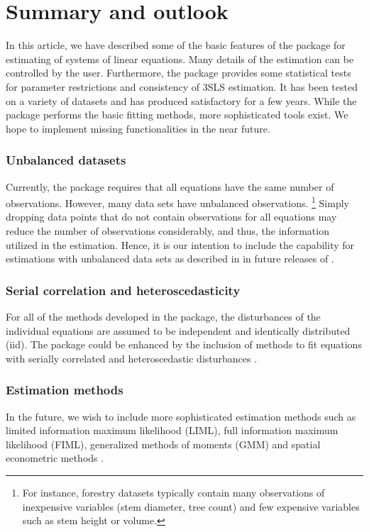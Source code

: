 

\section{Summary and outlook}\label{sec:Summmary}
\nopagebreak
In this article, we have described some of the basic features of the
 package for estimating of systems of linear
equations.
Many details of the estimation can be controlled by the user.
Furthermore, the package provides some statistical tests
for parameter restrictions and consistency of 3SLS estimation.
It has been tested on a variety of datasets and has produced satisfactory
for a few years.
While the  package performs the basic fitting methods,
more sophisticated tools exist.
We hope to implement missing functionalities
in the near future.

\subsubsection*{Unbalanced datasets}
Currently, the  package requires
that all equations have the same number of observations.
However, many data sets have unbalanced observations.%
\footnote{
For instance,
forestry datasets typically contain many observations of inexpensive
variables (stem diameter, tree count) and few expensive variables such
as stem height or volume.
}
Simply dropping data points that do not contain observations for all
equations may reduce the number of observations considerably, and
thus, the information utilized in the estimation.
Hence, it is our intention to include the capability for estimations
with unbalanced data sets as described in \citet{schmidt77} in future
releases of .

\subsubsection*{Serial correlation and heteroscedasticity}
For all of the methods developed in the package, the disturbances of
the individual equations are assumed to be independent and identically
distributed (iid).
The package could be enhanced by the inclusion of methods to fit
equations with serially correlated and heteroscedastic disturbances
\citep{parks67}. 

\subsubsection*{Estimation methods}
In the future, we wish to include more sophisticated estimation
methods such as limited information maximum likelihood (LIML),
full information maximum likelihood (FIML), generalized methods of
moments (GMM) and spatial econometric methods
\citep{paelinck79,anselin88}.

